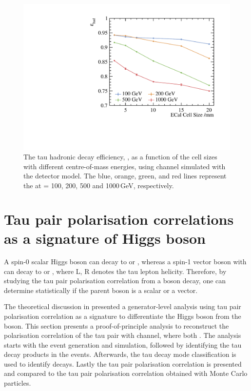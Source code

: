 \begin{figure}[htbp]
\centering %
\includegraphics[width=.85\textwidth]{tau/plots3/hadronicEff.pdf}
\caption[The tau hadronic decay efficiency as a function of  the \ECAL cell sizes at different \sqrtS with the \ILD detector model.]
{The tau hadronic decay efficiency, \tauHad, as a function of  the \ECAL cell sizes with different centre-of-mass energies, using \eeTauTau channel simulated with the \ILD detector model. The blue, orange, green, and red lines  represent the \tauHad at \sqrtS = 100, 200, 500 and 1000\,GeV, respectively.}
\label{fig:TauHadronicEfficiency}
\end{figure}


\section{Tau pair polarisation correlations as a signature of Higgs boson}
\label{sec:tauHZ}



A  spin-0 scalar Higgs boson can decay to  or , whereas  a   spin-1 vector boson \PZ with can decay to  or , where L, R denotes the tau lepton helicity. Therefore, by studying the tau pair polarisation correlation from a boson decay, one can determine statistically if the parent boson is a  scalar or a vector.

The theoretical discussion in  presented a generator-level analysis using tau pair polarisation correlation as a signature to differentiate the Higgs boson from the \PZ boson. This section presents a proof-of-principle analysis to reconstruct the polarisation correlation of the tau pair with \ZToTauTau channel, where both \tauToPion. The analysis starts with the event generation and simulation, followed by identifying the tau decay products in the events. Afterwards, the tau decay mode classification is used to identify \tauToPion decays. Lastly the tau pair polarisation correlation is presented and compared to  the tau pair polarisation correlation obtained with Monte Carlo particles.


